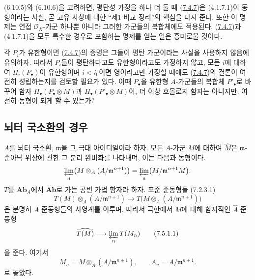 \begin{remark}[7.4.8]
\label{III.7.4.8-fr}
(6.10.5)와 (6.10.6)을 고려하면, 평탄성 가정을 하나 더 둘 때
(\hyperref[III.7.4.7-fr]{7.4.7})은 (4.1.7.1)이 동형이라는 사실, 곧
고유 사상에 대한 “제1 비교 정리”의 핵심을 다시 준다. 또한 이 명제는
연접 $\mathscr O_X$-가군 하나뿐 아니라 그러한 가군들의 복합체에도
적용된다. (\hyperref[III.7.4.7-fr]{7.4.7})과 (4.1.7.1)을 모두 특수한
경우로 포함하는 명제를 얻는 일은 흥미로울 것이다.

각 $P_i$가 유한형이면 (\hyperref[III.7.4.7-fr]{7.4.7})의 증명은
그들이 평탄 가군이라는 사실을 사용하지 않음에 유의하자. 따라서
$P_i$들이 평탄하다고도 유한형이라고도 가정하지 않고, 모든 $i$에
대하여 $H_i(P_\bullet)$이 유한형이며 $i<i_0$이면 영이라고만 가정할
때에도 (\hyperref[III.7.4.7-fr]{7.4.7})의 결론이 여전히 성립하는지를
검토할 필요가 있다. 이때 $P_\bullet$을 유한형 $A$-가군들의 복합체
$P'_\bullet$로 바꾸어 함자 $H_\bullet(P_\bullet\otimes M)$과
$H_\bullet(P'_\bullet\otimes M)$이, 더 이상 호몰로지 함자는 아니지만,
여전히 동형이 되게 할 수 있는가?
\end{remark}

\subsection{뇌터 국소환의 경우}
\label{subsection:III.7.5.fr}

\begin{env}[7.5.1]
\label{III.7.5.1-fr}
$A$를 뇌터 국소환, $\mathfrak m$을 그 극대 아이디얼이라 하자. 모든
$A$-가군 $M$에 대하여 $\widehat M$은 $\mathfrak m$-준아딕 위상에
관한 그 분리 완비화를 나타내며, 이는 다음과 동형이다.
\[
  \varprojlim_n\bigl(M\otimes_A(A/\mathfrak m^{n+1})\bigr)
  =
  \varprojlim_n\bigl(M/\mathfrak m^{n+1}M\bigr).
\]
$T$를 $\mathbf{Ab}_A$에서 $\mathbf{Ab}$로 가는 공변 가법 함자라 하자.
표준 준동형들 (7.2.3.1)
\[
  T(M)\otimes_A(A/\mathfrak m^{n+1})
  \longrightarrow
  T\bigl(M\otimes_A(A/\mathfrak m^{n+1})\bigr)
\]
은 분명히 $A$-준동형들의 사영계를 이루며, 따라서 극한에서 $M$에
대해 함자적인 $\widehat A$-준동형
\[
  \widehat{T(M)}
  \longrightarrow
  \varprojlim_n T(M_n)
  \tag{7.5.1.1}\label{III.7.5.1.1.fr}
\]
을 준다. 여기서
\[
  M_n=M\otimes_A(A/\mathfrak m^{n+1}),
  \qquad
  A_n=A/\mathfrak m^{n+1}.
\]
로 놓았다.
\end{env}

